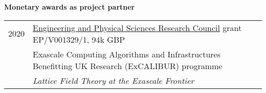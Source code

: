 \begin{spacelist}
  \vspace{18 pt}
  \item {\large \bfseries Monetary awards as project partner} \\[10 pt]
    \begin{tabular}[t]{cl}
      2020 & \href{https://epsrc.ukri.org}{Engineering and Physical Sciences Research Council} grant {EP/V001329/1}, 94k GBP \\
           &  Exascale Computing Algorithms and Infrastructures Benefitting UK Research (ExCALIBUR) programme                \\
           & \textit{Lattice Field Theory at the Exascale Frontier}                                                          \\
    \end{tabular}


\end{spacelist}
